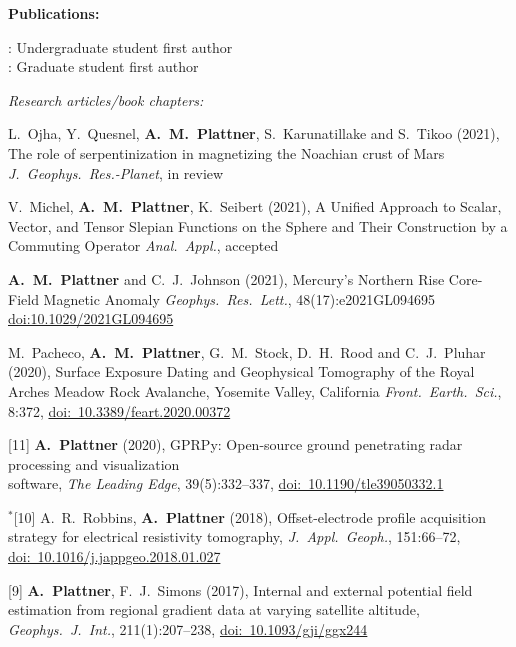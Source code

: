 \documentclass[10pt]{article}
\begin{document}
\spc
\textbf{\tsize Publications:}

\spcp
\ug: Undergraduate student first author\\
\gr: Graduate student first author


\spcp
\emph{Research articles/book chapters:}

\spcp
L.~Ojha, Y.~Quesnel, \textbf{A.~M.~Plattner}, S.~Karunatillake and S.~Tikoo (2021),
The role of serpentinization in magnetizing the Noachian crust of Mars
\emph{J.~Geophys.~Res.-Planet}, in review

\spcp
\shift[14] V.~Michel, \textbf{A.~M.~Plattner}, K.~Seibert (2021),
A Unified Approach to Scalar, Vector, and Tensor Slepian Functions on the Sphere and Their Construction by a Commuting Operator
\emph{Anal.~Appl.}, accepted

\spcp
\shift[13] \textbf{A.~M.~Plattner} and C.~J.~Johnson (2021),
Mercury's Northern Rise Core-Field Magnetic Anomaly
\emph{Geophys.~Res.~Lett.}, 48(17):e2021GL094695 \href{https://doi.org/10.1029/2021GL094695}{doi:10.1029/2021GL094695}

\spcp
\grshift \gr[12] M.~Pacheco, \textbf{A.~M.~Plattner}, G.~M.~Stock, D.~H.~Rood and C.~J.~Pluhar (2020),
Surface Exposure Dating and Geophysical Tomography of the Royal Arches Meadow Rock Avalanche, Yosemite Valley, California
\emph{Front.~Earth.~Sci.}, 8:372, \href{https://www.frontiersin.org/articles/10.3389/feart.2020.00372/full}{doi:~10.3389/feart.2020.00372} 

\spcp
\hspace{-0.675cm}[11] \textbf{A.~Plattner} (2020), GPRPy: Open-source ground penetrating radar processing and visualization \\software, \emph{The Leading Edge}, 39(5):332--337, \href{https://doi.org/10.1190/tle39050332.1}{doi:~10.1190/tle39050332.1}

\spcp
\hspace{-0.835cm}$^*$[10] A.~R.~Robbins, \textbf{A.~Plattner} (2018),
Offset-electrode profile acquisition strategy for
electrical resistivity tomography,
\emph{J.~Appl.~Geoph.}, 151:66--72, \href{https://www.sciencedirect.com/science/article/pii/S0926985117308376?via%3Dihub}{doi:~10.1016/j.jappgeo.2018.01.027} 


\spcp
\hspace{-0.5cm}[9] \textbf{A.~Plattner}, F.~J.~Simons (2017),
Internal and external potential field estimation
from regional gradient data at varying satellite altitude,
\emph{Geophys.~J.~Int.}, 211(1):207--238, \href{https://academic.oup.com/gji/article-lookup/doi/10.1093/gji/ggx244}{doi:~10.1093/gji/ggx244} 
\end{document}
